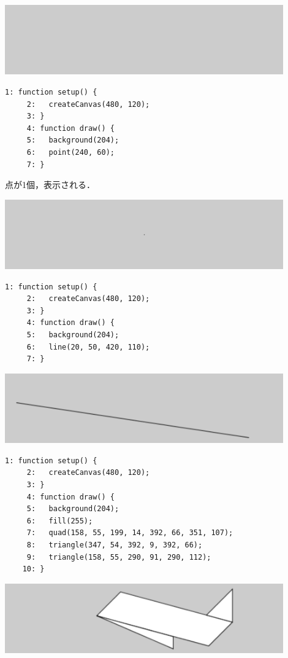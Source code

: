 \documentclass[a4j]{ltjsarticle}
\begin{document}
\includegraphics[height=3cm]{image/Ex_03_01.pdf}
\begin{lstlisting}[caption=Ex\_03\_02.js]
     1: function setup() {
     2:   createCanvas(480, 120);
     3: }
     4: function draw() {
     5:   background(204);  
     6:   point(240, 60);
     7: }
\end{lstlisting}
点が1個，表示される．

\includegraphics[height=3cm]{image/Ex_03_02.pdf}
\begin{lstlisting}[caption=Ex\_03\_03.js]
     1: function setup() {
     2:   createCanvas(480, 120);
     3: }
     4: function draw() {
     5:   background(204);
     6:   line(20, 50, 420, 110);
     7: }
\end{lstlisting}
\includegraphics[height=3cm]{image/Ex_03_03.pdf}
\begin{lstlisting}[caption=Ex\_03\_04.js]
     1: function setup() {
     2:   createCanvas(480, 120);
     3: }
     4: function draw() {
     5:   background(204);
     6:   fill(255);
     7:   quad(158, 55, 199, 14, 392, 66, 351, 107);
     8:   triangle(347, 54, 392, 9, 392, 66);
     9:   triangle(158, 55, 290, 91, 290, 112);
    10: }
\end{lstlisting}
\includegraphics[height=3cm]{image/Ex_03_04.pdf}
\end{document}
